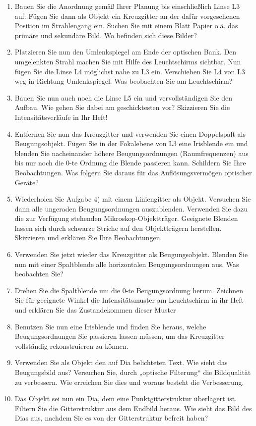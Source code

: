 \begin{enumerate}
	\item  Bauen Sie die Anordnung gemäß Ihrer Planung bis einschließlich Linse L3 auf. Fügen Sie dann
	als Objekt ein Kreuzgitter an der dafür vorgesehenen Position im Strahlengang ein. Suchen Sie
	mit einem Blatt Papier o.ä. das primäre und sekundäre Bild. Wo befinden sich diese Bilder?
	\item Platzieren Sie nun den Umlenkspiegel am Ende der optischen Bank. Den umgelenkten Strahl
	machen Sie mit Hilfe des Leuchtschirms sichtbar. Nun fügen Sie die Linse L4 möglichst nahe
	zu L3 ein. Verschieben Sie L4 von L3 weg in Richtung Umlenkspiegel. Was beobachten Sie am
	Leuchtschirm?
	\item Bauen Sie nun auch noch die Linse L5 ein und vervollständigen Sie den Aufbau. Wie gehen Sie
	dabei am geschicktesten vor? Skizzieren Sie die Intensitätsverläufe in Ihr Heft!
	\item  Entfernen Sie nun das Kreuzgitter und verwenden Sie einen Doppelspalt als Beugungsobjekt.
	Fügen Sie in der Fokalebene von L3 eine Irisblende ein und blenden Sie nacheinander höhere
	Beugungsordnungen (Raumfrequenzen) aus bis nur noch die 0-te Ordnung die Blende passieren
	kann. Schildern Sie Ihre Beobachtungen. Was folgern Sie daraus für das Auflösungsvermögen
	optischer Geräte?
	\item Wiederholen Sie Aufgabe 4) mit einem Liniengitter als Objekt. Versuchen Sie dann alle ungeraden
	Beugungsordnungen auszublenden. Verwenden Sie dazu die zur Verfügung stehenden
	Mikroskop-Objektträger. Geeignete Blenden lassen sich durch schwarze Striche auf den Objektträgern
	herstellen. Skizzieren und erklären Sie Ihre Beobachtungen.
	\item Verwenden Sie jetzt wieder das Kreuzgitter als Beugungsobjekt. Blenden Sie nun mit einer
	Spaltblende alle horizontalen Beugungsordnungen aus. Was beobachten Sie?
	\item Drehen Sie die Spaltblende um die 0-te Beugungsordnung herum. Zeichnen Sie für geeignete
	Winkel die Intensitätsmuster am Leuchtschirm in ihr Heft und erklären Sie das Zustandekommen
	dieser Muster
	\item Benutzen Sie nun eine Irisblende und finden Sie heraus, welche Beugungsordnungen Sie passieren
	lassen müssen, um das Kreuzgitter vollständig rekonstruieren zu können.
	\item  Verwenden Sie als Objekt den auf Dia belichteten Text. Wie sieht das Beugungsbild aus?
	Versuchen Sie, durch „optische Filterung“ die Bildqualität zu verbessern. Wie erreichen Sie
	dies und woraus besteht die Verbesserung.
	\item Das Objekt sei nun ein Dia, dem eine Punktgitterstruktur überlagert ist. Filtern Sie die
	Gitterstruktur aus dem Endbild heraus. Wie sieht das Bild des Dias aus, nachdem Sie es von
	der Gitterstruktur befreit haben?
\end{enumerate}